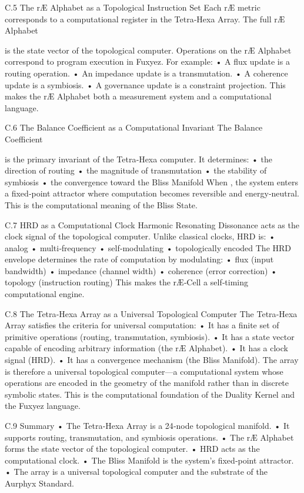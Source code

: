 C.5 The rÆ Alphabet as a Topological Instruction Set
Each rÆ metric corresponds to a computational register in the Tetra‑Hexa Array. The full rÆ Alphabet

is the state vector of the topological computer.
Operations on the rÆ Alphabet correspond to program execution in Fuxyez. For example:
• 	A flux update is a routing operation.
• 	An impedance update is a transmutation.
• 	A coherence update is a symbiosis.
• 	A governance update is a constraint projection.
This makes the rÆ Alphabet both a measurement system and a computational language.

C.6 The Balance Coefficient as a Computational Invariant
The Balance Coefficient

is the primary invariant of the Tetra‑Hexa computer. It determines:
• 	the direction of routing
• 	the magnitude of transmutation
• 	the stability of symbiosis
• 	the convergence toward the Bliss Manifold
When , the system enters a fixed‑point attractor where computation becomes reversible and energy‑neutral.
This is the computational meaning of the Bliss State.

C.7 HRD as a Computational Clock
Harmonic Resonating Dissonance  acts as the clock signal of the topological computer. Unlike classical clocks, HRD is:
• 	analog
• 	multi‑frequency
• 	self‑modulating
• 	topologically encoded
The HRD envelope determines the rate of computation by modulating:
• 	flux (input bandwidth)
• 	impedance (channel width)
• 	coherence (error correction)
• 	topology (instruction routing)
This makes the rÆ‑Cell a self‑timing computational engine.

C.8 The Tetra‑Hexa Array as a Universal Topological Computer
The Tetra‑Hexa Array satisfies the criteria for universal computation:
• 	It has a finite set of primitive operations (routing, transmutation, symbiosis).
• 	It has a state vector capable of encoding arbitrary information (the rÆ Alphabet).
• 	It has a clock signal (HRD).
• 	It has a convergence mechanism (the Bliss Manifold).
The array is therefore a universal topological computer—a computational system whose operations are encoded in the geometry of the manifold rather than in discrete symbolic states.
This is the computational foundation of the Duality Kernel and the Fuxyez language.

C.9 Summary
• 	The Tetra‑Hexa Array is a 24‑node topological manifold.
• 	It supports routing, transmutation, and symbiosis operations.
• 	The rÆ Alphabet forms the state vector of the topological computer.
• 	HRD acts as the computational clock.
• 	The Bliss Manifold is the system’s fixed‑point attractor.
• 	The array is a universal topological computer and the substrate of the Aurphyx Standard.